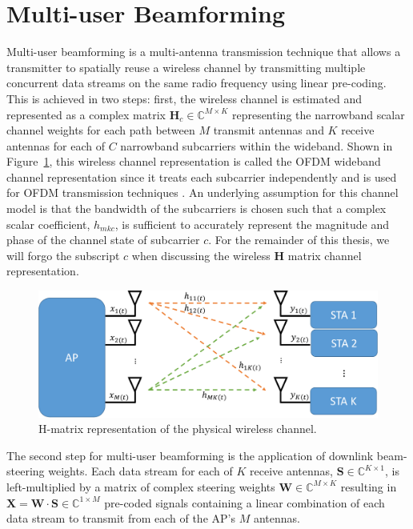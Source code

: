 \section{Multi-user Beamforming}
\label{sec_mubf_back}
	Multi-user beamforming is a multi-antenna transmission technique that allows a transmitter to spatially reuse a wireless channel by transmitting multiple concurrent data streams on the same radio frequency using linear pre-coding.
	This is achieved in two steps: first, the wireless channel is estimated and represented as a complex matrix $\mathbf{H}_c\in \mathbb{C}^{M\times K}$ representing the narrowband scalar channel weights for each path between $M$ transmit antennas and $K$ receive antennas for each of $C$ narrowband subcarriers within the wideband.
	Shown in Figure~\ref{fig_h_matrix}, this wireless channel representation is called the \ac{OFDM} wideband channel representation since it treats each subcarrier independently and is used for \ac{OFDM} transmission techniques \cite{perahia2008}.
	An underlying assumption for this channel model is that the bandwidth of the subcarriers is chosen such that a complex scalar coefficient, $h_{mkc}$, is sufficient to accurately represent the magnitude and phase of the channel state of subcarrier $c$.
	For the remainder of this thesis, we will forgo the subscript $c$ when discussing the wireless $\mathbf{H}$ matrix channel representation.
	
	\begin{figure}[h]
\centering
  \includegraphics[width=4.5in]{figs/general/beamforming_h_matrix}   
    \caption{H-matrix representation of the physical wireless channel.}
\label{fig_h_matrix}
\end{figure}

	The second step for multi-user beamforming is the application of downlink beam-steering weights.
	Each data stream for each of $K$ receive antennas, $\mathbf{S}\in \mathbb{C}^{K\times 1}$, is left-multiplied by a matrix of complex steering weights $\mathbf{W}\in \mathbb{C}^{M\times K}$  resulting in $\mathbf{X} = \mathbf{W}\cdot \mathbf{S} \in\mathbb{C}^{1\times M}$ pre-coded signals containing a linear combination of each data stream to transmit from each of the \ac{AP}'s $M$ antennas.
	

